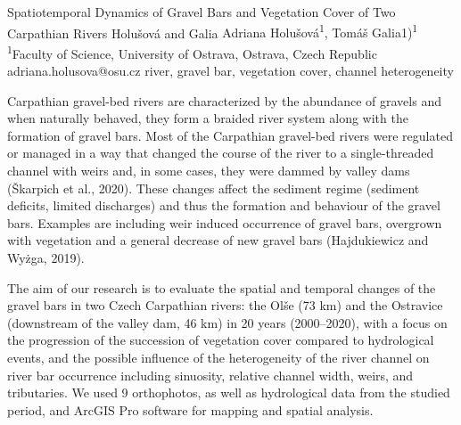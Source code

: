 \abstract
{Spatiotemporal Dynamics of Gravel Bars and Vegetation Cover of Two Carpathian Rivers} 
{Holušová and Galia} 
{Adriana Holušová\textsuperscript{1}, Tomáš Galia1)\textsuperscript{1}} 
{\TLtag} 
{
\textsuperscript{1}Faculty of Science, University of Ostrava, Ostrava, Czech Republic
}
{adriana.holusova@osu.cz}  %
{river, gravel bar, vegetation cover, channel heterogeneity}
{Carpathian gravel-bed rivers are characterized by the abundance of gravels and when naturally behaved, they form a braided river system along with the formation of gravel bars. Most of the Carpathian gravel-bed rivers were regulated or managed in a way that changed the course of the river to a single-threaded channel with weirs and, in some cases, they were dammed by valley dams (Škarpich et al., 2020). These changes affect the sediment regime (sediment deficits, limited discharges) and thus the formation and behaviour of the gravel bars. Examples are including weir induced occurrence of gravel bars, overgrown with vegetation and a general decrease of new gravel bars (Hajdukiewicz and Wyżga, 2019).

The aim of our research is to evaluate the spatial and temporal changes of the gravel bars in two Czech Carpathian rivers: the Olše (73 km) and the Ostravice (downstream of the valley dam, 46 km) in 20 years (2000–2020), with a focus on the progression of the succession of vegetation cover compared to hydrological events, and the possible influence of the heterogeneity of the river channel on river bar occurrence including sinuosity, relative channel width, weirs, and tributaries. We used 9 orthophotos, as well as hydrological data from the studied period, and ArcGIS Pro software for mapping and spatial analysis. 

}
